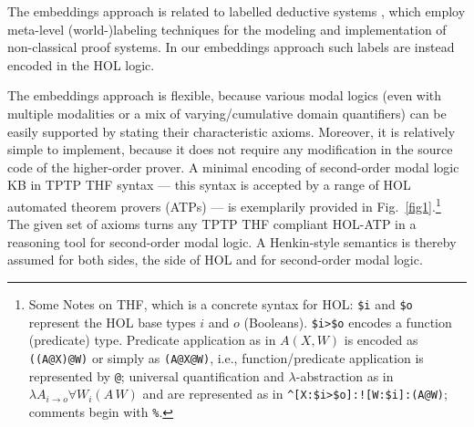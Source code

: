 \documentclass{llncs}
\begin{document}
The embeddings approach is related to labelled deductive systems
\cite{gabbay96}, which employ meta-level (world-)labeling techniques
for the modeling and implementation of non-classical proof systems. In
our embeddings approach such labels are instead encoded in the HOL
logic. 

The embeddings approach is flexible, because various modal logics (even
with multiple modalities or a mix of varying/cumulative domain
quantifiers) can be easily supported by stating their characteristic
axioms. Moreover, it is relatively simple to implement, because it
does not require any modification in the source code of the
higher-order prover. A minimal encoding of
second-order modal logic KB in TPTP THF syntax \cite{J22} --- this syntax is
accepted by a range of HOL automated theorem provers (ATPs) --- is
exemplarily provided in Fig.~\ref{fig1}.\footnote{Some Notes on THF, which is a concrete syntax for HOL: \texttt{\$i} and
                   \texttt{\$o} represent the HOL base types $i$ and
                   $o$ (Booleans). \texttt{\$i>\$o} encodes a function
                   (predicate) type.  Predicate
                   application as in $A(X,W)$ is encoded as
                   \texttt{((A@X)@W)} or simply as
                   \texttt{(A@X@W)}, i.e., function/predicate application
                   is represented by \texttt{@}; universal
                   quantification and $\lambda$-abstraction as in
                   $\lambda {A}_{i\rightarrow o} \forall {W_i} (A\,W)$
                   and are represented as in
                   \texttt{\^{}[X:\$i>\$o]:![W:\$i]:(A@W)}; comments begin with
                   \texttt{\%}.} The given set of axioms turns
any TPTP THF compliant HOL-ATP in a reasoning tool for second-order modal logic. A
Henkin-style semantics is thereby assumed for both sides, the side of HOL and
for second-order modal logic.
\end{document}
